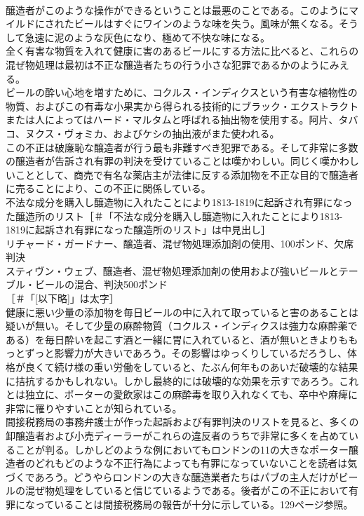 \documentclass[8pt]{extreport}
\begin{document}
\begin{CJK}{UTF8}{min}
\\	醸造者がこのような操作ができるということは最悪のことである。このようにマイルドにされたビールはすぐにワインのような味を失う。風味が無くなる。そうして急速に泥のような灰色になり、極めて不快な味になる。
\\	全く有害な物質を入れて健康に害のあるビールにする方法に比べると、これらの混ぜ物処理は最初は不正な醸造者たちの行う小さな犯罪であるかのようにみえる。
\\	ビールの酔い心地を増すために、コクルス・インディクスという有害な植物性の物質、およびこの有毒な小果実から得られる技術的にブラック・エクストラクトまたは人によってはハード・マルタムと呼ばれる抽出物を使用する。阿片、タバコ、ヌクス・ヴォミカ、およびケシの抽出液がまた使われる。
\\	この不正は破廉恥な醸造者が行う最も非難すべき犯罪である。そして非常に多数の醸造者が告訴され有罪の判決を受けていることは嘆かわしい。同じく嘆かわしいこととして、商売で有名な薬店主が法律に反する添加物を不正な目的で醸造者に売ることにより、この不正に関係している。
\\	不法な成分を購入し醸造物に入れたことにより1813-1819に起訴され有罪になった醸造所のリスト［＃「不法な成分を購入し醸造物に入れたことにより1813-1819に起訴され有罪になった醸造所のリスト」は中見出し］
\\	リチャード・ガードナー、醸造者、混ぜ物処理添加剤の使用、100ポンド、欠席判決
\\	スティヴン・ウェブ、醸造者、混ぜ物処理添加剤の使用および強いビールとテーブル・ビールの混合、判決500ポンド
\\	[以下略]［＃「[以下略]」は太字］
\\	健康に悪い少量の添加物を毎日ビールの中に入れて取っていると害のあることは疑いが無い。そして少量の麻酔物質（コクルス・インディクスは強力な麻酔薬である）を毎日酔いを起こす酒と一緒に胃に入れていると、酒が無いときよりももっとずっと影響力が大きいであろう。その影響はゆっくりしているだろうし、体格が良くて続け様の重い労働をしていると、たぶん何年ものあいだ破壊的な結果に拮抗するかもしれない。しかし最終的には破壊的な効果を示すであろう。これとは独立に、ポーターの愛飲家はこの麻酔毒を取り入れなくても、卒中や麻痺に非常に罹りやすいことが知られている。
\\	間接税務局の事務弁護士が作った起訴および有罪判決のリストを見ると、多くの卸醸造者および小売ディーラーがこれらの違反者のうちで非常に多くを占めていることが判る。しかしどのような例においてもロンドンの11の大きなポーター醸造者のどれもどのような不正行為によっても有罪になっていないことを読者は気づくであろう。どうやらロンドンの大きな醸造業者たちはパブの主人だけがビールの混ぜ物処理をしていると信じているようである。後者がこの不正において有罪になっていることは間接税務局の報告が十分に示している。129ページ参照。

\end{CJK}
\end{document}
